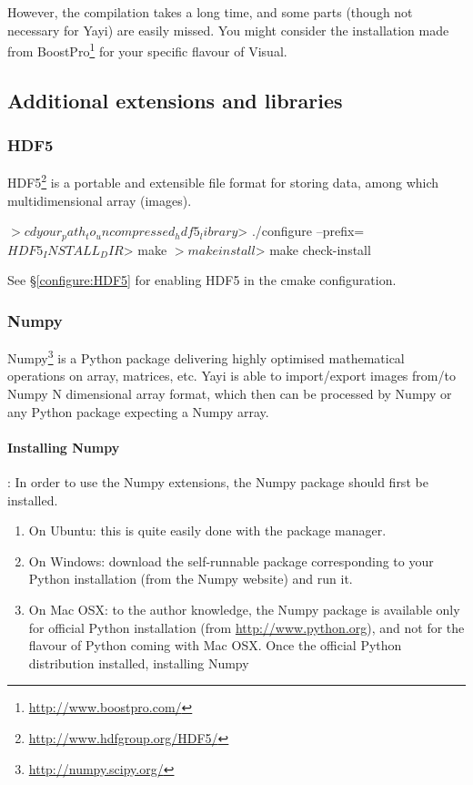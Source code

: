 However, the compilation takes a long time, and some parts (though not necessary for Yayi) are easily missed. You might consider the installation made from BoostPro\footnote{\url{http://www.boostpro.com/}} for your specific flavour of Visual. 

\subsection{Additional extensions and libraries}

\subsubsection{HDF5}
HDF5\footnote{\url{http://www.hdfgroup.org/HDF5/}} is a portable and extensible file format for storing data, among which multidimensional array (images). 
\begin{bash}
$> cd your_path_to_uncompressed_hdf5_library
$> ./configure --prefix=$HDF5_INSTALL_DIR
$> make
$> make install
$> make check-install
\end{bash}

See \S \ref{configure:HDF5} for enabling HDF5 in the cmake configuration.

\subsubsection{Numpy}
Numpy\footnote{\url{http://numpy.scipy.org/}} is a Python package delivering highly optimised mathematical operations on array, matrices, etc. Yayi is able to import/export images from/to Numpy N dimensional array format, which then can be processed by Numpy or any Python package expecting a Numpy array. 

\paragraph*{Installing Numpy}:
In order to use the Numpy extensions, the Numpy package should first be installed. 
\begin{enumerate}
\item On Ubuntu: this is quite easily done with the package manager. 
\item On Windows: download the self-runnable package corresponding to your Python installation (from the Numpy website) and run it.
\item On Mac OSX: to the author knowledge, the Numpy package is available only for official Python installation (from \url{http://www.python.org}), and not for the flavour of Python coming with Mac OSX. Once the official Python distribution installed, installing Numpy 
\end{enumerate}

